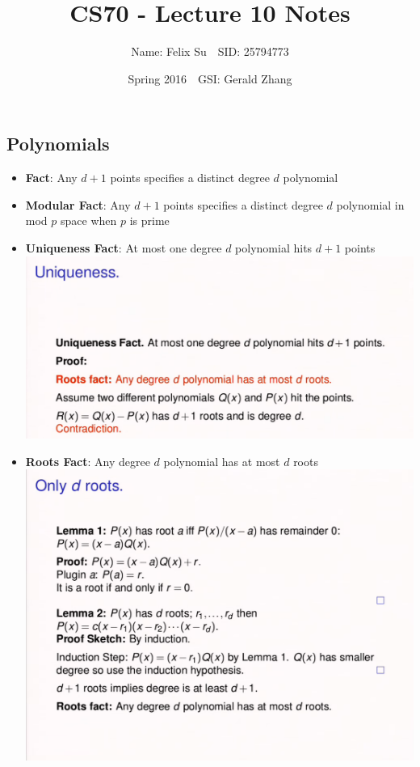 \documentclass{article}\usepackage{amsmath,amssymb,amsthm,tikz,tkz-graph,color,chngpage,soul,hyperref,csquotes,graphicx,floatrow}\newcommand*{\QEDB}{\hfill\ensuremath{\square}}\newtheorem*{prop}{Proposition}\renewcommand{\theenumi}{\alph{enumi}}\usepackage[shortlabels]{enumitem}\usepackage[nobreak=true]{mdframed}\usetikzlibrary{matrix,calc}\MakeOuterQuote{"}\usepackage[margin=0.75in]{geometry} \newtheorem{theorem}{Theorem}
\title{CS70 - Lecture 10 Notes}
\author{Name: Felix Su$\quad$SID: 25794773}
\date{Spring 2016$\quad$GSI: Gerald Zhang}
\begin{document}
\maketitle

\subsection*{Polynomials}
\begin{itemize}
\item \textbf{Fact}: Any $d+1$ points specifies a distinct degree $d$ polynomial 
\item \textbf{Modular Fact}: Any $d+1$ points specifies a distinct degree $d$ polynomial in mod $p$ space when $p$ is prime
\item \textbf{Uniqueness Fact}: At most one degree $d$ polynomial hits $d+1$ points\\
\includegraphics{uniquefact}
\item \textbf{Roots Fact}: Any degree $d$ polynomial has at most $d$ roots\\
\includegraphics{rootsfact}
\end{itemize}
\end{document}
